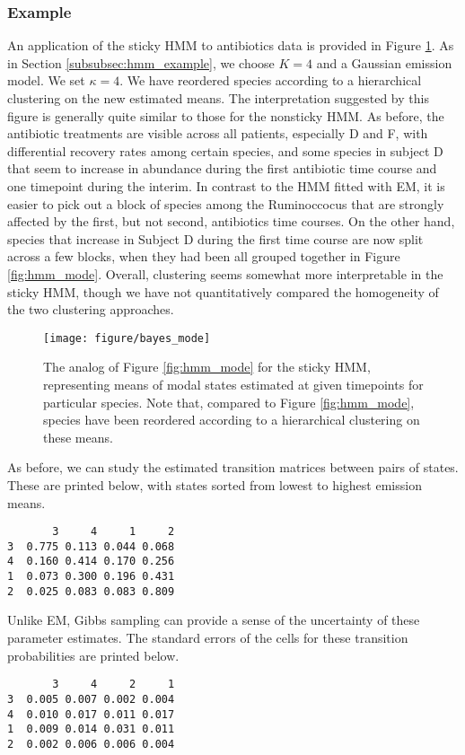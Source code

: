 \documentclass{article}
\begin{document}
\subsubsection{Example}
\label{subsubsec:sticky_hmm_example}

An application of the sticky HMM to antibiotics data is provided in Figure
\ref{fig:bayes_mode}. As in Section \ref{subsubsec:hmm_example}, we choose $K =
4$ and a Gaussian emission model. We set $\kappa = 4$. We have reordered
species according to a hierarchical clustering on the new estimated means. The
interpretation suggested by this figure is generally quite similar to those for
the nonsticky HMM. As before, the antibiotic treatments are visible across all
patients, especially D and F, with differential recovery rates among certain
species, and some species in subject D that seem to increase in abundance
during the first antibiotic time course and one timepoint during the interim.
In contrast to the HMM fitted with EM, it is easier to pick out a block of
species among the Ruminoccocus that are strongly affected by the first, but not
second, antibiotics time courses. On the other hand, species that increase in
Subject D during the first time course are now split across a few blocks, when
they had been all grouped together in Figure \ref{fig:hmm_mode}. Overall,
clustering seems somewhat more interpretable in the sticky HMM, though we have
not quantitatively compared the homogeneity of the two clustering approaches.

\begin{figure}[ht]
  \centering
  \texttt{[image: figure/bayes\_mode]}
  \caption{The analog of Figure \ref{fig:hmm_mode} for the sticky HMM,
    representing means of modal states estimated at given timepoints for
    particular species. Note that, compared to Figure \ref{fig:hmm_mode},
    species have been reordered according to a hierarchical clustering on these
    means. \label{fig:bayes_mode} }
\end{figure}

As before, we can study the estimated transition matrices between pairs of
states. These are printed below, with states sorted from lowest to highest
emission means.
\begin{verbatim}
       3     4     1     2
3  0.775 0.113 0.044 0.068
4  0.160 0.414 0.170 0.256
1  0.073 0.300 0.196 0.431
2  0.025 0.083 0.083 0.809
\end{verbatim}

Unlike EM, Gibbs sampling can provide a sense of the uncertainty of these
parameter estimates. The standard errors of the cells for these transition
probabilities are printed below.
\begin{verbatim}
       3     4     2     1
3  0.005 0.007 0.002 0.004
4  0.010 0.017 0.011 0.017
1  0.009 0.014 0.031 0.011
2  0.002 0.006 0.006 0.004
\end{verbatim}
\end{document}
